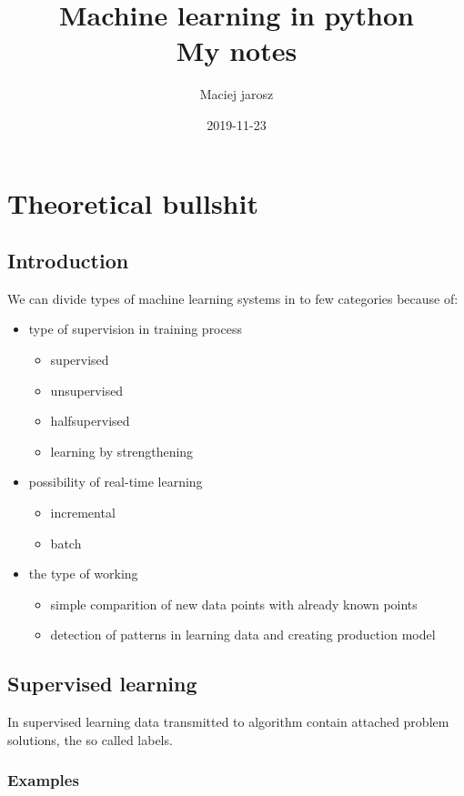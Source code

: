\documentclass{article}
\title{Machine learning in python \\ My notes}
\date{2019-11-23}
\author{Maciej jarosz}
\begin{document}
\maketitle
\newpage
{}

\section{Theoretical bullshit}

  \subsection{Introduction}

  We can divide types of machine learning systems in to few categories because of:
  \begin{itemize}
    \item type of supervision in training process
    \begin{itemize}
      \item supervised
      \item unsupervised
      \item halfsupervised
      \item learning by strengthening
    \end{itemize}
      \item possibility of real-time learning
    \begin{itemize}
      \item incremental
      \item batch
    \end{itemize}
      \item the type of working
    \begin{itemize}
      \item simple comparition of new data points with already known points
      \item detection of patterns in learning data and creating production model
    \end{itemize}
  \end{itemize}
  \newpage

  \subsection{Supervised learning}

  In supervised learning data transmitted to algorithm contain attached problem solutions, the so called labels.

    \subsubsection{Examples}
\end{document}
